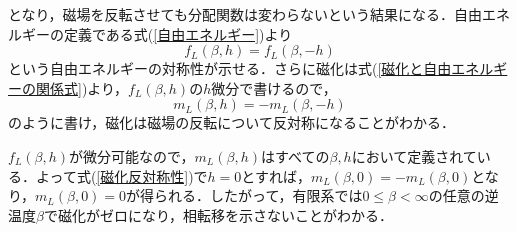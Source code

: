 \documentclass[a4paper,11pt]{jsreport}
\begin{document}
となり，磁場を反転させても分配関数は変わらないという結果になる．自由エネルギーの定義である式(\ref{自由エネルギー})より
\begin{equation}
  f_L(\beta, h) = f_L(\beta, -h)
\end{equation}
という自由エネルギーの対称性が示せる．さらに磁化は式(\ref{磁化と自由エネルギーの関係式})より，$f_L(\beta, h)$の$h$微分で書けるので，
\begin{equation}
  m_L(\beta, h) = -m_L(\beta, -h) \label{磁化反対称性}
\end{equation}
のように書け，磁化は磁場の反転について反対称になることがわかる．\par
$f_L(\beta, h)$が微分可能なので，$m_L(\beta, h)$はすべての$\beta, h$において定義されている．よって式(\ref{磁化反対称性})で$h=0$とすれば，$m_L(\beta, 0) = -m_L(\beta, 0)$となり，$m_L(\beta, 0)=0$が得られる．したがって，有限系では$0\leq \beta < \infty$の任意の逆温度$\beta$で磁化がゼロになり，相転移を示さないことがわかる．
\end{document}
